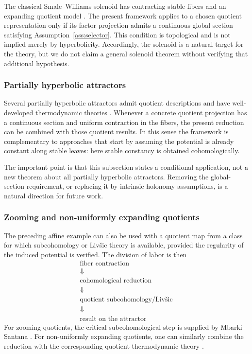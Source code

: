 \documentclass[11pt,a4paper]{article}
\begin{document}
The classical Smale--Williams solenoid has contracting stable fibers and an
expanding quotient model \cite{Williams}. The present framework applies to a
chosen quotient representation only if its factor projection admits a
continuous global section satisfying Assumption~\ref{ass:selector}. This
condition is topological and is not implied merely by hyperbolicity.
Accordingly, the solenoid is a natural target for the theory, but we do not
claim a general solenoid theorem without verifying that additional
hypothesis.

\subsubsection{Partially hyperbolic attractors}

Several partially hyperbolic attractors admit quotient descriptions and
have well-developed thermodynamic theories
\cite{FisherOliveira,RamosSiqueira,RiosSiqueira,
ClimenhagaPesinZelerowicz,ParmenterPollicott}. Whenever a concrete quotient
projection has a continuous section and uniform contraction in the fibers,
the present reduction can be combined with those quotient results. In this
sense the framework is complementary to approaches that start by assuming
the potential is already constant along stable leaves: here stable
constancy is obtained cohomologically.

The important point is that this subsection states a conditional
application, not a new theorem about all partially hyperbolic attractors.
Removing the global-section requirement, or replacing it by intrinsic
holonomy assumptions, is a natural direction for future work.

\subsubsection{Zooming and non-uniformly expanding quotients}

The preceding affine example can also be used with a quotient map from a
class for which subcohomology or Liv\v{s}ic theory is available, provided
the regularity of the induced potential is verified. The division of labor
is then
\[
\boxed{
\begin{array}{c}
\text{fiber contraction}\\
\Downarrow\\
\text{cohomological reduction}\\
\Downarrow\\
\text{quotient subcohomology/Liv\v{s}ic}\\
\Downarrow\\
\text{result on the attractor}
\end{array}}
\]
For zooming quotients, the critical subcohomological step is supplied by
Mbarki--Santana \cite{MbarkiSantana}. For non-uniformly expanding quotients,
one can similarly combine the reduction with the corresponding quotient
thermodynamic theory \cite{OliveiraViana,Pinheiro,VarandasViana,
AlvesRamosSiqueira}.
\end{document}
